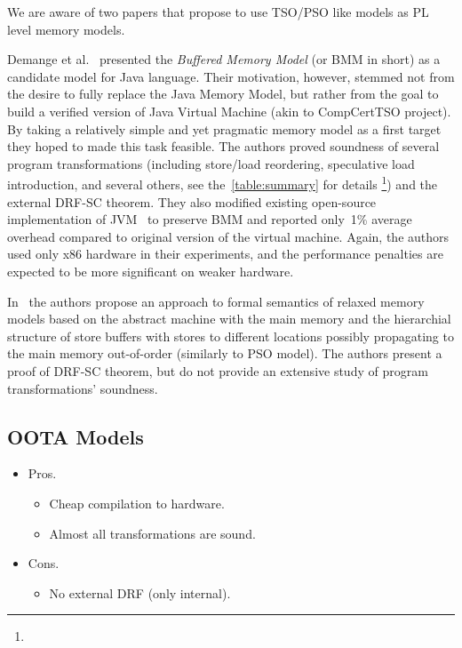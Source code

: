 We are aware of two papers that propose to use TSO/PSO 
like models as PL level memory models.

Demange et al.~\cite{Demange-el:POPL13} presented 
the \emph{Buffered Memory Model} (or BMM in short)
as a candidate model for Java language.
Their motivation, however, stemmed not from the desire 
to fully replace the Java Memory Model, but rather 
from the goal to build a verified version of 
Java Virtual Machine (akin to CompCertTSO project).
By taking a relatively simple and yet pragmatic memory model
as a first target they hoped to made this task feasible. 
The authors proved soundness of several program transformations
(including store/load reordering, speculative load introduction,
and several others, see 
the~\cref{table:summary} for details%
\footnote{})
and the external DRF-SC theorem. 
They also modified existing open-source implementation of 
JVM~\cite{Pizlo-el:ECCS10} to preserve BMM and 
reported only~1\% average overhead 
compared to original version of the virtual machine. 
Again, the authors used only x86 hardware in their 
experiments, and the performance penalties 
are expected to be more significant on weaker hardware.   

In~\cite{Boudol-el:POPL09} the authors propose 
an approach to formal semantics of relaxed memory models 
based on the abstract machine with the main memory 
and the hierarchial structure of store buffers 
with stores to different locations possibly 
propagating to the main memory out-of-order
(similarly to PSO model).
The authors present a proof of DRF-SC theorem,
but do not provide an extensive study 
of program transformations' soundness.

\subsection{OOTA Models}

\begin{itemize}
  \item Pros.
  \begin{itemize}
    \item Cheap compilation to hardware.
    \item Almost all transformations are sound. 
  \end{itemize}
  \item Cons.
  \begin{itemize}
    \item No external DRF (only internal).
  \end{itemize}
\end{itemize}

